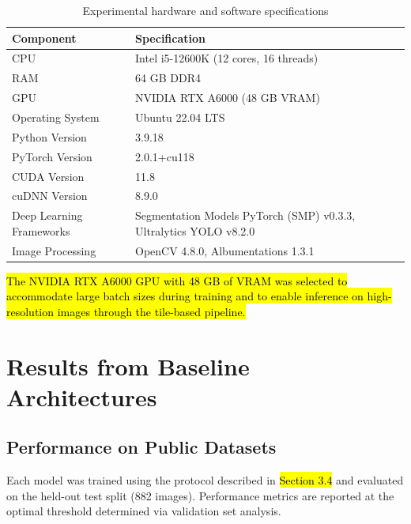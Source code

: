 \begin{table}[htbp]
    \centering
    \caption{Experimental hardware and software specifications}
    \label{tab:hardware_specs}
    \begin{tabular}{l p{}}
        \toprule
        \textbf{Component}       & \textbf{Specification}                                            \\
        \midrule
        CPU                      & Intel i5-12600K (12 cores, 16 threads)                            \\
        RAM                      & 64 GB DDR4                                                        \\
        GPU                      & NVIDIA RTX A6000 (48 GB VRAM)                                     \\
        Operating System         & Ubuntu 22.04 LTS                                                  \\
        Python Version           & 3.9.18                                                            \\
        PyTorch Version          & 2.0.1+cu118                                                       \\
        CUDA Version             & 11.8                                                              \\
        cuDNN Version            & 8.9.0                                                             \\
        Deep Learning Frameworks & Segmentation Models PyTorch (SMP) v0.3.3, Ultralytics YOLO v8.2.0 \\
        Image Processing         & OpenCV 4.8.0, Albumentations 1.3.1                                \\
        \bottomrule
    \end{tabular}
\end{table}

\hs \hl{The NVIDIA RTX A6000 GPU with 48 GB of VRAM was selected to accommodate large batch sizes during training and to enable inference on high-resolution images through the tile-based pipeline.}

\section{Results from Baseline Architectures}
\subsection{Performance on Public Datasets}
\hs Each model was trained using the protocol described in \hl{Section 3.4} and evaluated on the held-out test split (882 images). Performance metrics are reported at the optimal threshold determined via validation set analysis.

